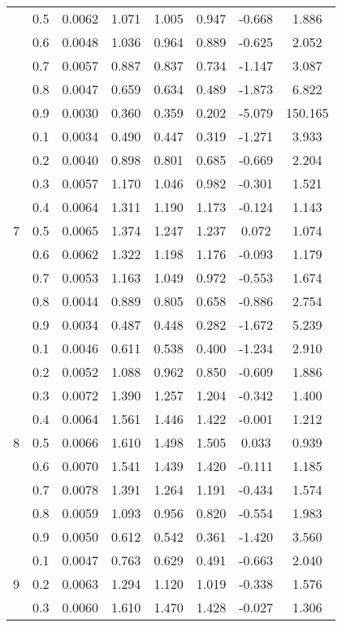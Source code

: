 \documentclass[11pt,a4paper]{report}
\begin{document}
\begin{longtable}{ | c | c || c | c | c | c | c | c | }
 & 0.5 & 0.0062 & 1.071 & 1.005 & 0.947 & -0.668 & 1.886 \\
 & 0.6 & 0.0048 & 1.036 & 0.964 & 0.889 & -0.625 & 2.052 \\
 & 0.7 & 0.0057 & 0.887 & 0.837 & 0.734 & -1.147 & 3.087 \\
 & 0.8 & 0.0047 & 0.659 & 0.634 & 0.489 & -1.873 & 6.822 \\
 & 0.9 & 0.0030 & 0.360 & 0.359 & 0.202 & -5.079 & 150.165 \\
 \hline
\multirow{9}{*}{7} & 0.1 & 0.0034 & 0.490 & 0.447 & 0.319 & -1.271 & 3.933 \\
 & 0.2 & 0.0040 & 0.898 & 0.801 & 0.685 & -0.669 & 2.204 \\
 & 0.3 & 0.0057 & 1.170 & 1.046 & 0.982 & -0.301 & 1.521 \\
 & 0.4 & 0.0064 & 1.311 & 1.190 & 1.173 & -0.124 & 1.143 \\
 & 0.5 & 0.0065 & 1.374 & 1.247 & 1.237 & 0.072 & 1.074 \\
 & 0.6 & 0.0062 & 1.322 & 1.198 & 1.176 & -0.093 & 1.179 \\
 & 0.7 & 0.0053 & 1.163 & 1.049 & 0.972 & -0.553 & 1.674 \\
 & 0.8 & 0.0044 & 0.889 & 0.805 & 0.658 & -0.886 & 2.754 \\
 & 0.9 & 0.0034 & 0.487 & 0.448 & 0.282 & -1.672 & 5.239 \\
 \hline
\multirow{9}{*}{8} & 0.1 & 0.0046 & 0.611 & 0.538 & 0.400 & -1.234 & 2.910 \\
 & 0.2 & 0.0052 & 1.088 & 0.962 & 0.850 & -0.609 & 1.886 \\
 & 0.3 & 0.0072 & 1.390 & 1.257 & 1.204 & -0.342 & 1.400 \\
 & 0.4 & 0.0064 & 1.561 & 1.446 & 1.422 & -0.001 & 1.212 \\
 & 0.5 & 0.0066 & 1.610 & 1.498 & 1.505 & 0.033 & 0.939 \\
 & 0.6 & 0.0070 & 1.541 & 1.439 & 1.420 & -0.111 & 1.185 \\
 & 0.7 & 0.0078 & 1.391 & 1.264 & 1.191 & -0.434 & 1.574 \\
 & 0.8 & 0.0059 & 1.093 & 0.956 & 0.820 & -0.554 & 1.983 \\
 & 0.9 & 0.0050 & 0.612 & 0.542 & 0.361 & -1.420 & 3.560 \\
 \hline
\multirow{9}{*}{9} & 0.1 & 0.0047 & 0.763 & 0.629 & 0.491 & -0.663 & 2.040 \\
 & 0.2 & 0.0063 & 1.294 & 1.120 & 1.019 & -0.338 & 1.576 \\
 & 0.3 & 0.0060 & 1.610 & 1.470 & 1.428 & -0.027 & 1.306 \\

\end{longtable}
\end{document}
